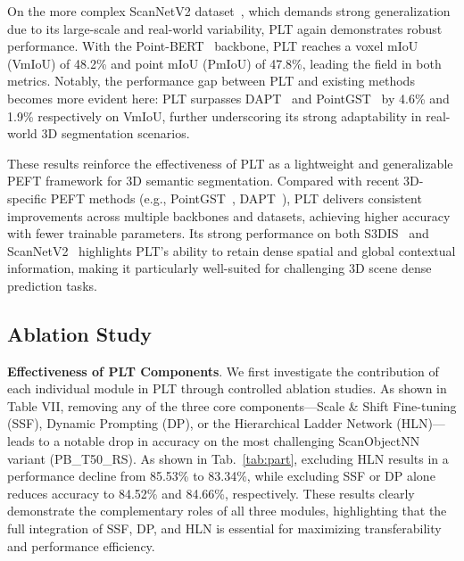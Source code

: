 On the more complex ScanNetV2 dataset~\cite{dai2017scannet}, which demands strong generalization due to its large-scale and real-world variability, PLT again demonstrates robust performance. With the Point-BERT~\cite{yu2022point} backbone, PLT reaches a voxel mIoU (VmIoU) of 48.2\% and point mIoU (PmIoU) of 47.8\%, leading the field in both metrics. Notably, the performance gap between PLT and existing methods becomes more evident here: PLT surpasses DAPT~\cite{zhou2024dynamic} and PointGST~\cite{liang2024parameter} by 4.6\% and 1.9\% respectively on VmIoU, further underscoring its strong adaptability in real-world 3D segmentation scenarios.

These results reinforce the effectiveness of PLT as a lightweight and generalizable PEFT framework for 3D semantic segmentation. Compared with recent 3D-specific PEFT methods (e.g., PointGST~\cite{liang2024parameter}, DAPT~\cite{zhou2024dynamic}), PLT delivers consistent improvements across multiple backbones and datasets, achieving higher accuracy with fewer trainable parameters. Its strong performance on both S3DIS~\cite{armeni20163d} and ScanNetV2~\cite{dai2017scannet} highlights PLT’s ability to retain dense spatial and global contextual information, making it particularly well-suited for challenging 3D scene dense prediction tasks.











\subsection{Ablation Study}

\textbf{Effectiveness of PLT Components}. We first investigate the contribution of each individual module in PLT through controlled ablation studies. As shown in Table VII, removing any of the three core components—Scale \& Shift Fine-tuning (SSF), Dynamic Prompting (DP), or the Hierarchical Ladder Network (HLN)—leads to a notable drop in accuracy on the most challenging ScanObjectNN variant (PB\_T50\_RS). As shown in Tab.~\ref{tab:part}, excluding HLN results in a performance decline from 85.53\% to 83.34\%, while excluding SSF or DP alone reduces accuracy to 84.52\% and 84.66\%, respectively. These results clearly demonstrate the complementary roles of all three modules, highlighting that the full integration of SSF, DP, and HLN is essential for maximizing transferability and performance efficiency.

